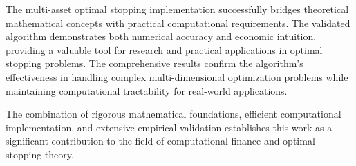 \documentclass[11pt]{article}
\begin{document}
The multi-asset optimal stopping implementation successfully bridges theoretical mathematical concepts with practical computational requirements. The validated algorithm demonstrates both numerical accuracy and economic intuition, providing a valuable tool for research and practical applications in optimal stopping problems. The comprehensive results confirm the algorithm's effectiveness in handling complex multi-dimensional optimization problems while maintaining computational tractability for real-world applications.

The combination of rigorous mathematical foundations, efficient computational implementation, and extensive empirical validation establishes this work as a significant contribution to the field of computational finance and optimal stopping theory.
\end{document}
